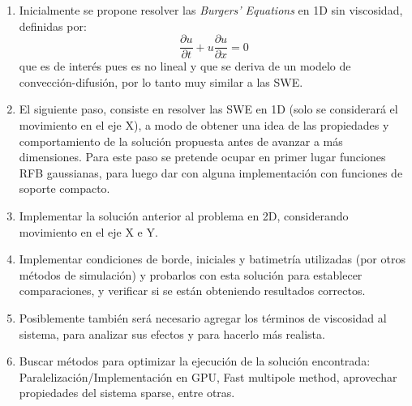 \documentclass[spanish, fleqn]{article}
\begin{document}
\begin{enumerate}
\item Inicialmente se propone resolver las \emph{Burgers' Equations} en 1D sin viscosidad, definidas por:
\begin{equation}
\frac{\partial u}{\partial t} + u\frac{\partial u}{\partial x} = 0
\label{eq:burger}
\end{equation}
que es de interés pues es no lineal y que se deriva de un modelo de convección-difusión, por lo tanto muy similar a las SWE.

\item El siguiente paso, consiste en resolver las SWE en 1D (solo se considerará el movimiento en el eje X), a modo de obtener una idea de las propiedades y comportamiento de la solución propuesta antes de avanzar a más dimensiones. Para este paso se pretende ocupar en primer lugar funciones RFB gaussianas, para luego dar con alguna implementación con funciones de soporte compacto.

\item Implementar la solución anterior al problema en 2D, considerando movimiento en el eje X e Y. 

\item Implementar condiciones de borde, iniciales y batimetría utilizadas (por otros métodos de simulación) y probarlos con esta solución para establecer comparaciones, y verificar si se están obteniendo resultados correctos.

\item Posiblemente también será necesario agregar los términos de viscosidad al sistema, para analizar sus efectos y para hacerlo más realista.

\item Buscar métodos para optimizar la ejecución de la solución encontrada: Paralelización/Implementación en GPU, Fast multipole method, aprovechar propiedades del sistema sparse, entre otras.
\end{enumerate}
\end{document}
